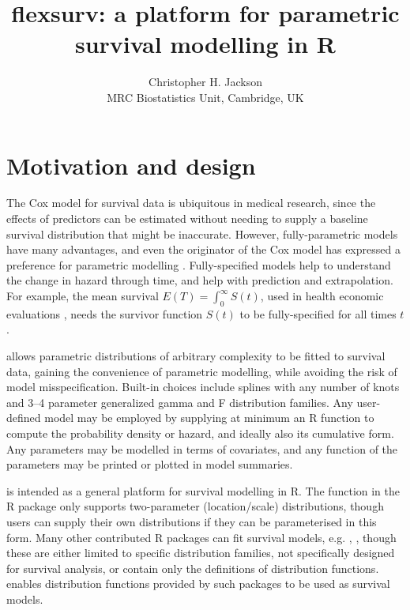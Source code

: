 \documentclass[nojss,nofooter]{jss}
\author{Christopher H. Jackson \\ MRC Biostatistics Unit, Cambridge, UK \\ \email{chris.jackson@mrc-bsu.cam.ac.uk}}
\title{flexsurv: a platform for parametric survival modelling in R}
\begin{document}
\section{Motivation and design}

The Cox model for survival data is ubiquitous in medical research, since the effects of
predictors can be estimated without needing to supply a
baseline survival distribution that might be inaccurate.  However,
fully-parametric models have many advantages, and even the originator
of the Cox model has expressed a preference for parametric modelling
\citep[see][]{reid:cox:conversation}.  Fully-specified models help to
understand the change in hazard through time, and help with prediction
and extrapolation. For example, the mean survival $E(T) =
\int_0^{\infty}S(t)$, used in health economic
evaluations \citep{latimer2013survival}, needs the survivor function
$S(t)$ to be fully-specified for all times $t$.


 allows parametric distributions of
arbitrary complexity to be fitted to survival data, gaining the
convenience of parametric modelling, while avoiding the risk of model
misspecification.  Built-in choices include splines with any number of
knots \citep{royston:parmar} and 3--4 parameter generalized gamma and
F distribution families.  Any user-defined model may be employed by
supplying at minimum an R function to compute the probability density
or hazard, and ideally also its cumulative form.  Any parameters may
be modelled in terms of covariates, and any function of the parameters
may be printed or plotted in model summaries.

 is intended as a general platform for survival
modelling in R.  The  function in the R package
 \citep{therneau:survival} only supports two-parameter
(location/scale) distributions, though users can supply their own
distributions if they can be parameterised in this form.  Many other
contributed R packages can fit survival models, e.g. 
\citep{eha},  \citep{yee:wild}, though these are either
limited to specific distribution families, not specifically designed
for survival analysis, or \citep[][]{actudistns}
contain only the definitions of distribution functions.
 enables distribution functions provided by such
packages to be used as survival models.
\end{document}
